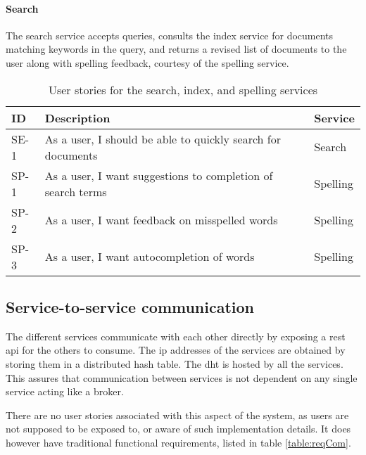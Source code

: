 \paragraph{Search}
The search service accepts queries, consults the index service for documents matching keywords in the query, and returns a revised list of documents to the user along with spelling feedback, courtesy of the spelling service.

\begin{table}[H]
   \caption{User stories for the search, index, and spelling services}
   \centering
   \label{table:reqSearch}
   \begin{tabular}{|p{1.3cm}|p{9.5cm}|p{4cm}|}\hline%
        ID & Description & Service\\\hline\hline
        SE-1 & As a user, I should be able to quickly search for documents & Search \\ \hline
        SP-1 & As a user, I want suggestions to completion of search terms & Spelling \\ \hline
        SP-2 & As a user, I want feedback on misspelled words & Spelling \\ \hline
        SP-3 & As a user, I want autocompletion of words & Spelling \\ \hline
    \end{tabular}
\end{table}


\subsection{Service-to-service communication}
The different services communicate with each other directly by exposing a \acrshort{rest} \acrshort{api} for the others to consume. The \acrshort{ip} addresses of the services are obtained by storing them in a distributed hash table. The \acrshort{dht} is hosted by all the services. This assures that communication between services is not dependent on any single service acting like a broker.

There are no user stories associated with this aspect of the system, as users are not supposed to be exposed to, or aware of such implementation details. It does however have traditional functional requirements, listed in table \ref{table:reqCom}.


